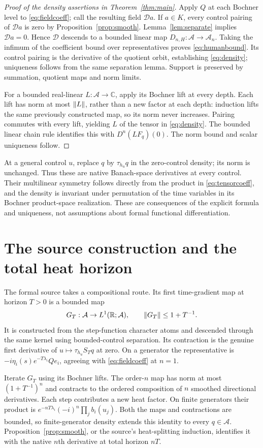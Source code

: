 \documentclass[11pt]{article}
\theoremstyle{remark}\newtheorem{remark}[theorem]{Remark}
\newcommand{\R}{\mathbb R}\newcommand{\C}{\mathbb C}
\newcommand{\A}{\mathcal A}\newcommand{\X}{\mathcal X}
\begin{document}
\begin{proof}[Proof of the density assertions in Theorem~\ref{thm:main}]
Apply $Q$ at each Bochner level to \eqref{eq:fieldcoeff}; call the resulting field $\mathcal D a$. If $a\in K$, every control pairing of $\mathcal D a$ is zero by Proposition~\ref{prop:smooth}. Lemma~\ref{lem:separate} implies $\mathcal D a=0$. Hence $\mathcal D$ descends to a bounded linear map $D_{n,H}:\A\to\A_n$. Taking the infimum of the coefficient bound over representatives proves \eqref{eq:humanbound}. Its control pairing is the derivative of the quotient orbit, establishing \eqref{eq:density}; uniqueness follows from the same separation lemma. Support is preserved by summation, quotient maps and norm limits.

For a bounded real-linear $L:\A\to\C$, apply its Bochner lift at every depth. Each lift has norm at most $\left\lVert L\right\rVert$, rather than a new factor at each depth: induction lifts the same previously constructed map, so its norm never increases. Pairing commutes with every lift, yielding $L$ of the tensor in \eqref{eq:density}. The bounded linear chain rule identifies this with $D^n(LF_q)(0)$. The norm bound and scalar uniqueness follow.
\end{proof}

At a general control $u$, replace $q$ by $\tau_{h_u}q$ in the zero-control density; its norm is unchanged. Thus these are native Banach-space derivatives at every control. Their multilinear symmetry follows directly from the product in \eqref{eq:tensorcoeff}, and the density is invariant under permutation of the time variables in its Bochner product-space realization. These are consequences of the explicit formula and uniqueness, not assumptions about formal functional differentiation.

\section{The source construction and the total heat horizon}
The formal source takes a compositional route. Its first time-gradient map at horizon $T>0$ is a bounded map
\[
 G_T:\A\to L^1(\R;\A),\qquad \norm{G_T}\le1+T^{-1}.
\]
It is constructed from the step-function character atoms and descended through the same kernel using bounded-control separation. Its contraction is the genuine first derivative of $u\mapsto\tau_{h_u}S_Tq$ at zero. On a generator the representative is $-i\eta_i(s)e^{-T\lambda_i}Qe_i$, agreeing with \eqref{eq:fieldcoeff} at $n=1$.

Iterate $G_T$ using its Bochner lifts. The order-$n$ map has norm at most $(1+T^{-1})^n$ and contracts to the ordered composition of $n$ smoothed directional derivatives. Each step contributes a new heat factor. On finite generators their product is $e^{-nT\lambda_i}(-i)^n\prod_jb_i(u_j)$. Both the maps and contractions are bounded, so finite-generator density extends this identity to every $q\in\A$. Proposition~\ref{prop:smooth}, or the source's heat-splitting induction, identifies it with the native $n$th derivative at total horizon $nT$.
\end{document}
